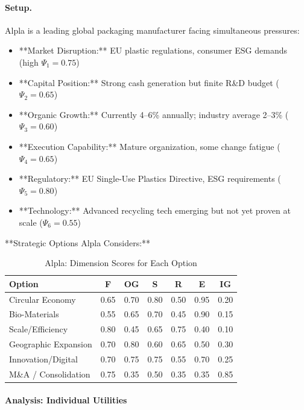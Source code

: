 \paragraph{Setup.}

Alpla is a leading global packaging manufacturer facing simultaneous pressures:
\begin{itemize}
    \item **Market Disruption:** EU plastic regulations, consumer ESG demands (high $\Psi_1 = 0.75$)
    \item **Capital Position:** Strong cash generation but finite R\&D budget ($\Psi_2 = 0.65$)
    \item **Organic Growth:** Currently 4--6\% annually; industry average 2--3\% ($\Psi_3 = 0.60$)
    \item **Execution Capability:** Mature organization, some change fatigue ($\Psi_4 = 0.65$)
    \item **Regulatory:** EU Single-Use Plastics Directive, ESG requirements ($\Psi_5 = 0.80$)
    \item **Technology:** Advanced recycling tech emerging but not yet proven at scale ($\Psi_6 = 0.55$)
\end{itemize}

**Strategic Options Alpla Considers:**

\begin{table}[htbp]
\centering
\caption{Alpla: Dimension Scores for Each Option}
\label{tab:alpla-options}
\renewcommand{\arraystretch}{1.3}
\begin{tabular}{@{}lcccccc@{}}
\toprule
\textbf{Option} & \textbf{F} & \textbf{OG} & \textbf{S} & \textbf{R} & \textbf{E} & \textbf{IG} \\
\midrule
Circular Economy & 0.65 & 0.70 & 0.80 & 0.50 & 0.95 & 0.20 \\
Bio-Materials & 0.55 & 0.65 & 0.70 & 0.45 & 0.90 & 0.15 \\
Scale/Efficiency & 0.80 & 0.45 & 0.65 & 0.75 & 0.40 & 0.10 \\
Geographic Expansion & 0.70 & 0.80 & 0.60 & 0.65 & 0.50 & 0.30 \\
Innovation/Digital & 0.70 & 0.75 & 0.75 & 0.55 & 0.70 & 0.25 \\
M\&A / Consolidation & 0.75 & 0.35 & 0.50 & 0.35 & 0.35 & 0.85 \\
\bottomrule
\end{tabular}
\end{table}

\paragraph{Analysis: Individual Utilities}

